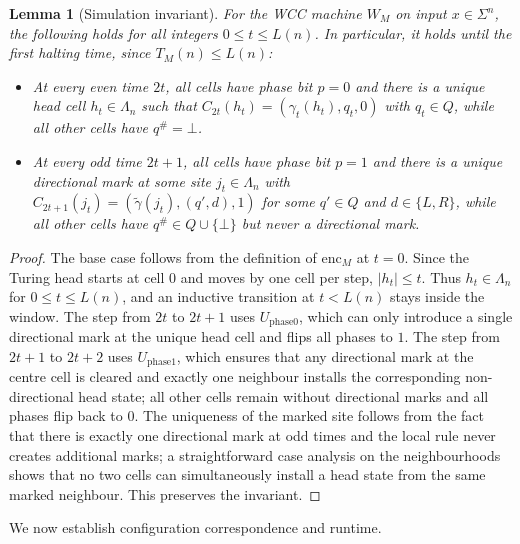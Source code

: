 \documentclass[12pt]{article}
\newtheorem{lemma}[theorem]{Lemma}
\begin{document}
\begin{lemma}[Simulation invariant]
\label{lem:invariant}
For the WCC machine $W_M$ on input $x \in \Sigma^n$, the following holds for
all integers $0\le t\le L(n)$. In particular, it holds until the first
halting time, since $T_M(n)\le L(n)$:
\begin{itemize}
  \item At every \emph{even} time $2t$, all cells have phase bit $p=0$ and there
    is a unique head cell $h_t \in \Lambda_n$ such that
    $C_{2t}(h_t) = (\gamma_t(h_t), q_t, 0)$ with $q_t \in Q$, while all other
    cells have $q^\# = \bot$.
  \item At every \emph{odd} time $2t+1$, all cells have phase bit $p=1$ and
    there is a unique directional mark at some site $j_t \in \Lambda_n$ with
    $C_{2t+1}(j_t) = (\widetilde\gamma(j_t), (q',d), 1)$ for some $q' \in Q$
    and $d \in \{L,R\}$, while all other cells have
    $q^\# \in Q \cup \{\bot\}$ but never a directional mark.
\end{itemize}
\end{lemma}

\begin{proof}
The base case follows from the definition of $\mathrm{enc}_M$ at $t=0$.
Since the Turing head starts at cell $0$ and moves by one cell per step,
$|h_t|\le t$. Thus $h_t\in\Lambda_n$ for $0\le t\le L(n)$, and an
inductive transition at $t<L(n)$ stays inside the window. The step
from $2t$ to $2t+1$ uses $U_{\mathrm{phase0}}$, which can only introduce a
single directional mark at the unique head cell and flips all phases to $1$. The
step from $2t+1$ to $2t+2$ uses $U_{\mathrm{phase1}}$, which ensures that any
directional mark at the centre cell is cleared and exactly one neighbour
installs the corresponding non-directional head state; all other cells remain
without directional marks and all phases flip back to $0$. The uniqueness of the
marked site follows from the fact that there is exactly one directional mark at
odd times and the local rule never creates additional marks; a straightforward
case analysis on the neighbourhoods shows that no two cells can simultaneously
install a head state from the same marked neighbour. This preserves the
invariant.
\end{proof}

We now establish configuration correspondence and runtime.
\end{document}
